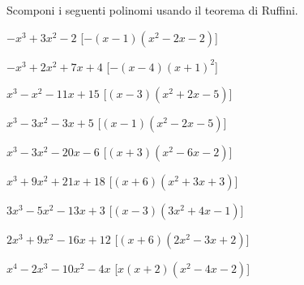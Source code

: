 \begin{esercizio}\label{ese:}
 Scomponi i seguenti polinomi usando il teorema di Ruffini.
 \begin{enumeratea}
\item \(- x^{3} + 3 x^{2} - 2\)
  \hfill [\(- \left(x - 1\right) \left(x^{2} - 2 x - 2\right)\)]
\item \(- x^{3} + 2 x^{2} + 7 x + 4\)
  \hfill [\(- \left(x - 4\right) \left(x + 1\right)^{2}\)]
\item \(x^{3} - x^{2} - 11 x + 15\)
  \hfill [\(\left(x - 3\right) \left(x^{2} + 2 x - 5\right)\)]
\item \(x^{3} - 3 x^{2} - 3 x + 5\)
  \hfill [\(\left(x - 1\right) \left(x^{2} - 2 x - 5\right)\)]
\item \(x^{3} - 3 x^{2} - 20 x - 6\)
  \hfill [\(\left(x + 3\right) \left(x^{2} - 6 x - 2\right)\)]
\item \(x^{3} + 9 x^{2} + 21 x + 18\)
  \hfill [\(\left(x + 6\right) \left(x^{2} + 3 x + 3\right)\)]
\item \(3 x^{3} - 5 x^{2} - 13 x + 3\)
  \hfill [\(\left(x - 3\right) \left(3 x^{2} + 4 x - 1\right)\)]
\item \(2 x^{3} + 9 x^{2} - 16 x + 12\)
  \hfill [\(\left(x + 6\right) \left(2 x^{2} - 3 x + 2\right)\)]
\item \(x^{4} - 2 x^{3} - 10 x^{2} - 4 x\)
  \hfill [\(x \left(x + 2\right) \left(x^{2} - 4 x - 2\right)\)]

\end{enumeratea}
\end{esercizio}
